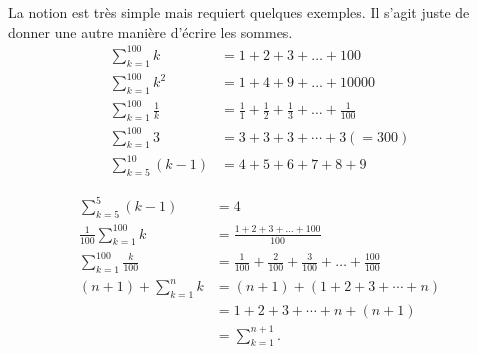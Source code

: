 \begin{frame}
  \begin{example}La notion est très simple mais requiert quelques exemples. Il s'agit juste de donner une autre manière d'écrire les sommes.
    \begin{align*}
      \sum_{k= 1}^{100} k &= 1 + 2 + 3 + \ldots + 100\\
      \sum_{k= 1}^{100} k^{2} &= 1 + 4 + 9 + \ldots + 10000\\
      \sum_{k= 1}^{100} \frac{1}{k} &= \frac{1}{1} + \frac{1}{2} + \frac{1}{3} + \ldots + \frac{1}{100}\\
      \sum_{k= 1}^{100} 3 &= 3 + 3 + 3 + \cdots + 3 (= 300)\\
      \sum_{k= 5}^{10} (k-1) &= 4 + 5 + 6 + 7 + 8 + 9
    \end{align*}
  \end{example}
\end{frame}
\begin{frame}
  \begin{example}
    \begin{align*}
      \sum_{k= 5}^{5} (k-1) &= 4\\
      \frac{1}{100}\sum_{k= 1}^{100} k &= \frac{1 + 2 + 3 + \ldots + 100}{100}\\
      \sum_{k= 1}^{100} \frac{k}{100} &= \frac{1}{100} + \frac{2}{100} + \frac{3}{100} + \ldots + \frac{100}{100}\\
      (n+1) + \sum_{k=1}^{n} k &= (n+1) + (1 + 2 + 3 + \cdots + n) \\
                            &= 1 + 2 + 3 + \cdots + n + (n+1)\\
                            &= \sum_{k=1}^{n+1}.
    \end{align*}
  \end{example}
\end{frame}

